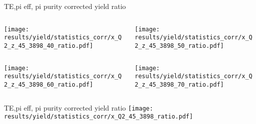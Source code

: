 \begin{frame}{TE,pi eff, pi purity corrected yield ratio}
\begin{columns}
\begin{column}[T]{0.5\textwidth}
\texttt{[image: results/yield/statistics\_corr/x\_Q2\_z\_45\_3898\_40\_ratio.pdf]}
\end{column}
\begin{column}[T]{0.5\textwidth}
\texttt{[image: results/yield/statistics\_corr/x\_Q2\_z\_45\_3898\_50\_ratio.pdf]}
\end{column}
\end{columns}
\begin{columns}
\begin{column}[T]{0.5\textwidth}
\texttt{[image: results/yield/statistics\_corr/x\_Q2\_z\_45\_3898\_60\_ratio.pdf]}
\end{column}
\begin{column}[T]{0.5\textwidth}
\texttt{[image: results/yield/statistics\_corr/x\_Q2\_z\_45\_3898\_70\_ratio.pdf]}
\end{column}
\end{columns}
\end{frame}
\begin{frame}{TE,pi eff, pi purity corrected yield ratio}
\texttt{[image: results/yield/statistics\_corr/x\_Q2\_45\_3898\_ratio.pdf]}
\end{frame}
